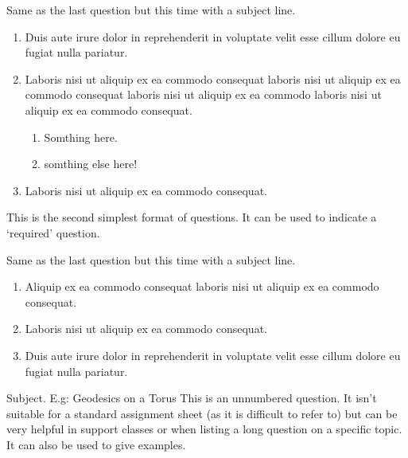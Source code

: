 \documentclass[11pt,many]{noether}
\begin{document}
\begin{nquest}
  Same as the last question but this time with a subject line.
  \begin{enumerate}
    \item Duis aute irure dolor in reprehenderit in voluptate velit esse cillum dolore eu fugiat nulla pariatur.
    \item Laboris nisi ut aliquip ex ea commodo consequat laboris nisi ut aliquip ex ea commodo consequat laboris nisi ut aliquip ex ea commodo laboris nisi ut aliquip ex ea commodo consequat.
    \begin{enumerate}
      \item Somthing here.
      \item somthing else here!
    \end{enumerate}
    \item Laboris nisi ut aliquip ex ea commodo consequat.
  \end{enumerate}
\end{nquest}

\begin{nfquest}
  This is the second simplest format of questions. It can be used to indicate a `required' question.
\end{nfquest}

\begin{nfquest}
  Same as the last question but this time with a subject line.
  \begin{enumerate}
    \item Aliquip ex ea commodo consequat laboris nisi ut aliquip ex ea commodo consequat.
    \item Laboris nisi ut aliquip ex ea commodo consequat.
    \item Duis aute irure dolor in reprehenderit in voluptate velit esse cillum dolore eu fugiat nulla pariatur.
  \end{enumerate}
\end{nfquest}

\begin{quest}{Subject. E.g: Geodesics on a Torus}
  This is an unnumbered question. It isn't suitable for a standard assignment sheet (as it is difficult to refer to) but can be very helpful in support classes or when listing a long question on a specific topic. It can also be used to give examples.
\end{quest}
\end{document}
